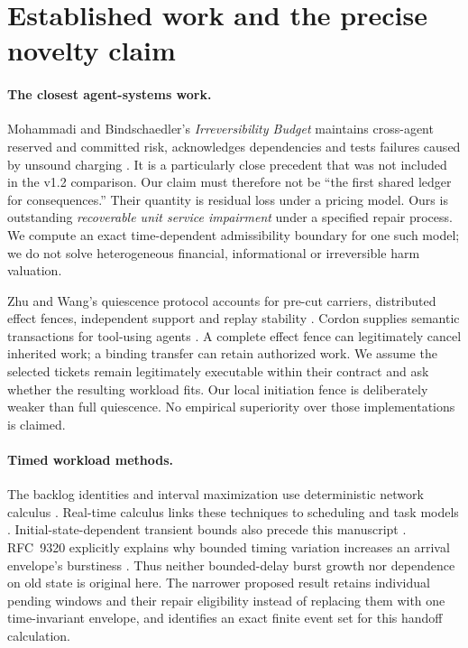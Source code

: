 \documentclass[11pt,a4paper]{article}
\theoremstyle{definition}\newtheorem{definition}{Definition}
\begin{document}
\section{Established work and the precise novelty claim}
\label{sec:related}
\paragraph{The closest agent-systems work.}
Mohammadi and Bindschaedler's \emph{Irreversibility Budget} maintains cross-agent reserved and committed risk, acknowledges dependencies and tests failures caused by unsound charging \cite{risk}. It is a particularly close precedent that was not included in the v1.2 comparison. Our claim must therefore not be ``the first shared ledger for consequences.'' Their quantity is residual loss under a pricing model. Ours is outstanding \emph{recoverable unit service impairment} under a specified repair process. We compute an exact time-dependent admissibility boundary for one such model; we do not solve heterogeneous financial, informational or irreversible harm valuation.

Zhu and Wang's quiescence protocol accounts for pre-cut carriers, distributed effect fences, independent support and replay stability \cite{quiescence}. Cordon supplies semantic transactions for tool-using agents \cite{cordon}. A complete effect fence can legitimately cancel inherited work; a binding transfer can retain authorized work. We assume the selected tickets remain legitimately executable within their contract and ask whether the resulting workload fits. Our local initiation fence is deliberately weaker than full quiescence. No empirical superiority over those implementations is claimed.

\paragraph{Timed workload methods.}
The backlog identities and interval maximization use deterministic network calculus \cite{netcal}. Real-time calculus links these techniques to scheduling and task models \cite{rtc}. Initial-state-dependent transient bounds also precede this manuscript \cite{transient}. RFC~9320 explicitly explains why bounded timing variation increases an arrival envelope's burstiness \cite{detnet}. Thus neither bounded-delay burst growth nor dependence on old state is original here. The narrower proposed result retains individual pending windows and their repair eligibility instead of replacing them with one time-invariant envelope, and identifies an exact finite event set for this handoff calculation.
\end{document}
